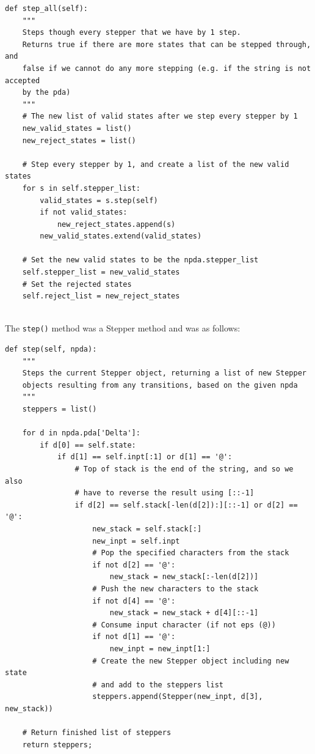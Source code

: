 \documentclass[a4paper]{article}
\begin{document}
\begin{verbatim}
def step_all(self):
    """
    Steps though every stepper that we have by 1 step.
    Returns true if there are more states that can be stepped through, and
    false if we cannot do any more stepping (e.g. if the string is not accepted
    by the pda)
    """
    # The new list of valid states after we step every stepper by 1
    new_valid_states = list()
    new_reject_states = list()

    # Step every stepper by 1, and create a list of the new valid states
    for s in self.stepper_list:
        valid_states = s.step(self)
        if not valid_states:
            new_reject_states.append(s)
        new_valid_states.extend(valid_states)

    # Set the new valid states to be the npda.stepper_list
    self.stepper_list = new_valid_states
    # Set the rejected states
    self.reject_list = new_reject_states
\end{verbatim}

\noindent
\\The \texttt{step()} method was a Stepper method and was as follows:\\

\begin{verbatim}
def step(self, npda):
    """
    Steps the current Stepper object, returning a list of new Stepper
    objects resulting from any transitions, based on the given npda
    """
    steppers = list()

    for d in npda.pda['Delta']:
        if d[0] == self.state:
            if d[1] == self.inpt[:1] or d[1] == '@':
                # Top of stack is the end of the string, and so we also
                # have to reverse the result using [::-1]
                if d[2] == self.stack[-len(d[2]):][::-1] or d[2] == '@':
                    new_stack = self.stack[:]
                    new_inpt = self.inpt
                    # Pop the specified characters from the stack
                    if not d[2] == '@':
                        new_stack = new_stack[:-len(d[2])]
                    # Push the new characters to the stack
                    if not d[4] == '@':
                        new_stack = new_stack + d[4][::-1]
                    # Consume input character (if not eps (@))
                    if not d[1] == '@':
                        new_inpt = new_inpt[1:]
                    # Create the new Stepper object including new state
                    # and add to the steppers list
                    steppers.append(Stepper(new_inpt, d[3], new_stack))

    # Return finished list of steppers
    return steppers;
\end{verbatim}
\end{document}
